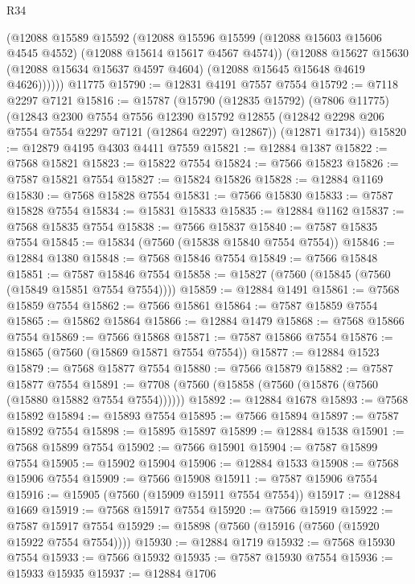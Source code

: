 \begin{lexlean}{R34}
\begin{coremodule}
          (@12088
            @15589
            @15592
            (@12088
              @15596
              @15599
              (@12088 @15603 @15606 @4545 @4552)
              (@12088 @15614 @15617 @4567 @4574))
            (@12088
              @15627
              @15630
              (@12088 @15634 @15637 @4597 @4604)
              (@12088 @15645 @15648 @4619 @4626))))))
    @11775
@15790 := @12831 @4191 @7557 @7554
@15792 := @7118 @2297 @7121
@15816 := @15787
    (@15790
      (@12835 @15792)
      (@7806 @11775)
      (@12843
        @2300
        @7554
        @7556
        @12390
        @15792
        @12855
        (@12842 @2298 @206 @7554 @7554 @2297 @7121 (@12864 @2297) @12867))
      (@12871 @1734))
@15820 := @12879 @4195 @4303 @4411 @7559
@15821 := @12884 @1387
@15822 := @7568 @15821
@15823 := @15822 @7554
@15824 := @7566 @15823
@15826 := @7587 @15821 @7554
@15827 := @15824 @15826
@15828 := @12884 @1169
@15830 := @7568 @15828 @7554
@15831 := @7566 @15830
@15833 := @7587 @15828 @7554
@15834 := @15831 @15833
@15835 := @12884 @1162
@15837 := @7568 @15835 @7554
@15838 := @7566 @15837
@15840 := @7587 @15835 @7554
@15845 := @15834 (@7560 (@15838 @15840 @7554 @7554))
@15846 := @12884 @1380
@15848 := @7568 @15846 @7554
@15849 := @7566 @15848
@15851 := @7587 @15846 @7554
@15858 := @15827 (@7560 (@15845 (@7560 (@15849 @15851 @7554 @7554))))
@15859 := @12884 @1491
@15861 := @7568 @15859 @7554
@15862 := @7566 @15861
@15864 := @7587 @15859 @7554
@15865 := @15862 @15864
@15866 := @12884 @1479
@15868 := @7568 @15866 @7554
@15869 := @7566 @15868
@15871 := @7587 @15866 @7554
@15876 := @15865 (@7560 (@15869 @15871 @7554 @7554))
@15877 := @12884 @1523
@15879 := @7568 @15877 @7554
@15880 := @7566 @15879
@15882 := @7587 @15877 @7554
@15891 := @7708 (@7560 (@15858 (@7560 (@15876 (@7560 (@15880 @15882 @7554 @7554))))))
@15892 := @12884 @1678
@15893 := @7568 @15892
@15894 := @15893 @7554
@15895 := @7566 @15894
@15897 := @7587 @15892 @7554
@15898 := @15895 @15897
@15899 := @12884 @1538
@15901 := @7568 @15899 @7554
@15902 := @7566 @15901
@15904 := @7587 @15899 @7554
@15905 := @15902 @15904
@15906 := @12884 @1533
@15908 := @7568 @15906 @7554
@15909 := @7566 @15908
@15911 := @7587 @15906 @7554
@15916 := @15905 (@7560 (@15909 @15911 @7554 @7554))
@15917 := @12884 @1669
@15919 := @7568 @15917 @7554
@15920 := @7566 @15919
@15922 := @7587 @15917 @7554
@15929 := @15898 (@7560 (@15916 (@7560 (@15920 @15922 @7554 @7554))))
@15930 := @12884 @1719
@15932 := @7568 @15930 @7554
@15933 := @7566 @15932
@15935 := @7587 @15930 @7554
@15936 := @15933 @15935
@15937 := @12884 @1706

\end{coremodule}
\end{lexlean}
